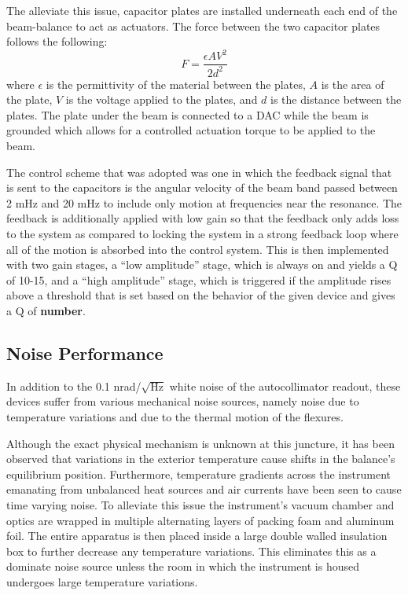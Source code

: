 \documentclass [12pt, proquest]{uwthesis}[2019]
\begin{document}
The alleviate this issue, capacitor plates are installed underneath each end of the beam-balance to act as actuators. The force between the two capacitor plates follows the following: 
\begin{equation}
F=\frac{\epsilon A V^2}{2d^2} \label{cap}
\end{equation}
where $\epsilon$ is the permittivity of the material between the plates, $A$ is the area of the plate, $V$ is the voltage applied to the plates, and $d$ is the distance between the plates. The plate under the beam is connected to a DAC while the beam is grounded which allows for a controlled actuation torque to be applied to the beam. 

The control scheme that was adopted was one in which the feedback signal that is sent to the capacitors is the angular velocity of the beam band passed between 2 mHz and 20 mHz to include only motion at frequencies near the resonance. The feedback is additionally applied with low gain so that the feedback only adds loss to the system as compared to locking the system in a strong feedback loop where all of the motion is absorbed into the control system. This is then implemented with two gain stages, a ``low amplitude'' stage, which is always on and yields a Q of 10-15, and a ``high amplitude'' stage, which is triggered if the amplitude rises above a threshold that is set based on the behavior of the given device and gives a Q of \textbf{number}.

\subsection{Noise Performance}

In addition to the 0.1 nrad/$\sqrt{\text{Hz}}$ white noise of the autocollimator readout, these devices suffer from various mechanical noise sources, namely noise due to temperature variations and due to the thermal motion of the flexures.

Although the exact physical mechanism is unknown at this juncture, it has been observed that variations in the exterior temperature cause shifts in the balance's equilibrium position. Furthermore, temperature gradients across the instrument emanating from unbalanced heat sources and air currents have been seen to cause time varying noise. To alleviate this issue the instrument's vacuum chamber and optics are wrapped in multiple alternating layers of packing foam and aluminum foil. The entire apparatus is then placed inside a large double walled insulation box to further decrease any temperature variations. This eliminates this as a dominate noise source unless the room in which the instrument is housed undergoes large temperature variations.
\end{document}

